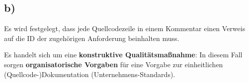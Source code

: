 \subsection*{b)}

Es wird festgelegt, dass jede Quellcodezeile in einem Kommentar einen Verweis auf die ID der zugehörigen Anforderung beinhalten muss.


Es handelt sich um eine \textbf{konstruktive Qualitätsmaßnahme}: In diesem Fall sorgen  \textbf{organisatorische Vorgaben} für eine Vorgabe zur einheitlichen (Quellcode-)Dokumentation (Unternehmens-Standards).
